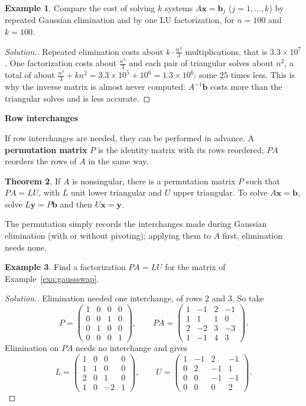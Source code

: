 \documentclass[11pt,a4paper]{article}
\numberwithin{equation}{section}
\theoremstyle{definition}
\newtheorem{thm}{Theorem}[subsection]
\newtheorem{exa}[thm]{Example}
\newenvironment{solution}
  {\renewcommand{\qedsymbol}{}\begin{proof}[\textit{Solution}.]}
  {\end{proof}}
\newcommand{\subhead}[1]{%
  \par\medskip\noindent\textbf{#1}\par\nobreak\smallskip}
\begin{document}
\begin{exa}
\label{exa:lucost}
Compare the cost of solving $k$ systems $A\mathbf x = \mathbf b_j$ ($j = 1,\dots,k$) by repeated Gaussian elimination and by one LU
factorization, for $n = 100$ and $k = 100$.
\end{exa}

\begin{solution}
Repeated elimination costs about $k\cdot\frac{n^3}{3}$ multiplications, that is $3.3\times10^7$. One factorization costs about
$\frac{n^3}{3}$ and each pair of triangular solves about $n^2$, a total of about $\frac{n^3}{3}+kn^2 = 3.3\times10^5+10^6 = 1.3\times10^6$:
some $25$ times less. This is why the inverse matrix is almost never computed: $A^{-1}\mathbf b$ costs more than the triangular solves
and is less accurate.
\end{solution}

\subhead{Row interchanges}
If row interchanges are needed, they can be performed in advance. A \textbf{permutation matrix} $P$ is the identity matrix with its rows
reordered; $PA$ reorders the rows of $A$ in the same way.

\begin{thm}
\label{thm:plu}
If $A$ is nonsingular, there is a permutation matrix $P$ such that $PA = LU$, with $L$ unit lower triangular and $U$ upper triangular.
To solve $A\mathbf x = \mathbf b$, solve $L\mathbf y = P\mathbf b$ and then $U\mathbf x = \mathbf y$.
\end{thm}

The permutation simply records the interchanges made during Gaussian elimination (with or without pivoting); applying them to $A$ first,
elimination needs none.

\begin{exa}
\label{exa:plu}
Find a factorization $PA = LU$ for the matrix of Example~\ref{exa:gaussswap}.
\end{exa}

\begin{solution}
Elimination needed one interchange, of rows $2$ and $3$. So take
$$P = \begin{pmatrix}1&0&0&0\\0&0&1&0\\0&1&0&0\\0&0&0&1\end{pmatrix},\qquad PA = \begin{pmatrix}1&-1&2&-1\\1&1&1&0\\2&-2&3&-3\\1&-1&4&3\end{pmatrix}.$$
Elimination on $PA$ needs no interchange and gives
$$L = \begin{pmatrix}1&0&0&0\\1&1&0&0\\2&0&1&0\\1&0&-2&1\end{pmatrix},\qquad U = \begin{pmatrix}1&-1&2&-1\\0&2&-1&1\\0&0&-1&-1\\0&0&0&2\end{pmatrix}.$$
\end{solution}
\end{document}
